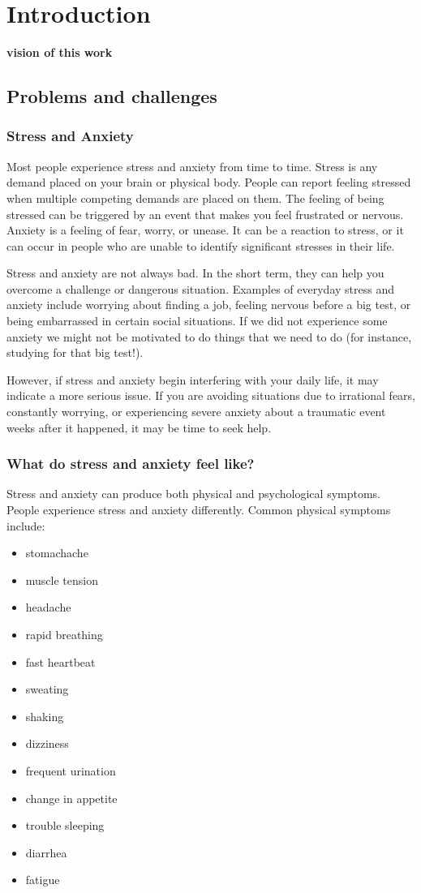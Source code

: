 \chapter{Introduction}

\textbf{vision of this work}

\section{Problems and challenges}
\subsection{Stress and Anxiety}
Most people experience stress and anxiety from time to time. Stress is any demand placed on your brain or physical body. People can report feeling stressed when multiple competing demands are placed on them. The feeling of being stressed can be triggered by an event that makes you feel frustrated or nervous. Anxiety is a feeling of fear, worry, or unease. It can be a reaction to stress, or it can occur in people who are unable to identify significant stresses in their life.

Stress and anxiety are not always bad. In the short term, they can help you overcome a challenge or dangerous situation. Examples of everyday stress and anxiety include worrying about finding a job, feeling nervous before a big test, or being embarrassed in certain social situations. If we did not experience some anxiety we might not be motivated to do things that we need to do (for instance, studying for that big test!).

However, if stress and anxiety begin interfering with your daily life, it may indicate a more serious issue. If you are avoiding situations due to irrational fears, constantly worrying, or experiencing severe anxiety about a traumatic event weeks after it happened, it may be time to seek help.

\subsection{What do stress and anxiety feel like?}
Stress and anxiety can produce both physical and psychological symptoms. People experience stress and anxiety differently. Common physical symptoms include: 
\begin{itemize}
    \item stomachache
    \item muscle tension
    \item headache
    \item rapid breathing
    \item fast heartbeat
    \item sweating
    \item shaking
    \item dizziness
    \item frequent urination
    \item change in appetite
    \item trouble sleeping
    \item diarrhea
    \item fatigue
\end{itemize}{}

